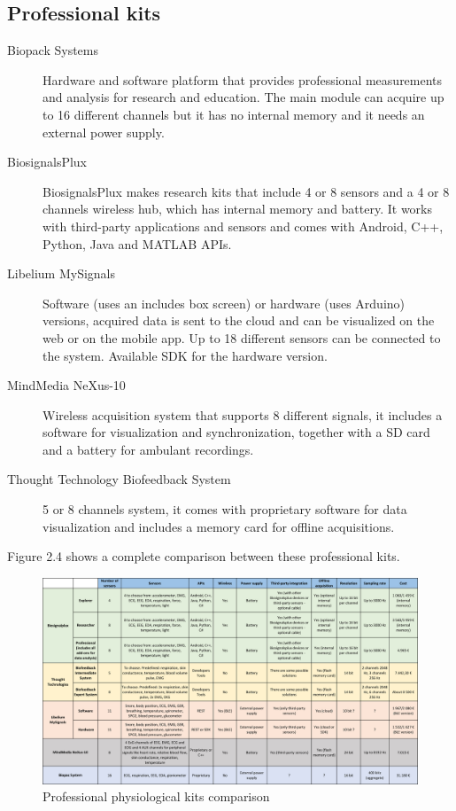\documentclass[binding=0.6cm,LaM]{sapthesis}
\begin{document}
\subsection{Professional kits}

\begin{description}

\item[Biopack Systems]
Hardware and software platform that provides professional measurements and analysis for research and education. The main module can acquire up to 16 different channels but it has no internal memory and it needs an external power supply.

\item[BiosignalsPlux]
BiosignalsPlux makes research kits that include 4 or 8 sensors and a 4 or 8 channels wireless hub, which has internal memory and battery. It works with third-party applications and sensors and comes with  Android, C++, Python, Java and MATLAB APIs.

\item[Libelium MySignals]
Software (uses an includes box screen) or hardware (uses Arduino) versions, acquired data is sent to the cloud and can be visualized on the web or on the mobile app. Up to 18 different sensors can be connected to the system. Available SDK for the hardware version.

\item[MindMedia NeXus-10]
Wireless acquisition system that supports 8 different signals, it includes a software for visualization and synchronization, together with a SD card and a battery for ambulant recordings.

\item[Thought Technology Biofeedback System]
5 or 8 channels system, it comes with proprietary software for data visualization and includes a memory card for offline acquisitions.

\end{description}

Figure 2.4 shows a complete comparison between these professional kits.

\begin{figure}
\centering
\includegraphics[scale=.9, angle=90]{images/table2}
\caption{Professional physiological kits comparison}
\end{figure}
\end{document}

